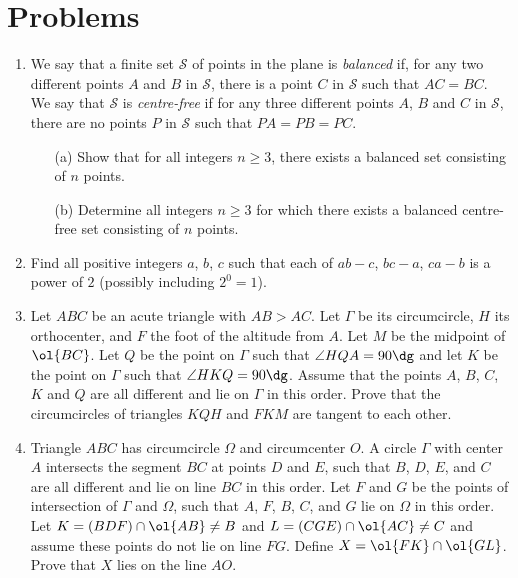 \documentclass[11pt]{scrartcl}
\begin{document}
\section{Problems}
\begin{enumerate}[\bfseries 1.]
\item %
We say that a finite set $\mathcal{S}$ of points in the plane
is \emph{balanced} if,
for any two different points $A$ and $B$ in $\mathcal{S}$,
there is a point $C$ in $\mathcal{S}$ such that $AC=BC$.
We say that $\mathcal{S}$ is \emph{centre-free} if for
any three different points $A$, $B$ and $C$ in $\mathcal{S}$,
there are no points $P$ in $\mathcal{S}$ such that $PA=PB=PC$.

\begin{enumerate}
\item[(a)] Show that for all integers $n\ge 3$,
  there exists a balanced set consisting of $n$ points.
\item[(b)] Determine all integers $n\ge 3$ for which
  there exists a balanced centre-free set consisting of $n$ points.
\end{enumerate}

\item %
Find all positive integers $a$, $b$, $c$ such that
each of $ab-c$, $bc-a$, $ca-b$ is a power of $2$
(possibly including $2^0=1$).

\item %
Let $ABC$ be an acute triangle with $AB > AC$.
Let $\Gamma$ be its circumcircle, $H$ its orthocenter, and $F$ the foot of the altitude from $A$.
Let $M$ be the midpoint of $\ol{BC}$.
Let $Q$ be the point on $\Gamma$ such that $\angle HQA = 90\dg$
and let $K$ be the point on $\Gamma$ such that $\angle HKQ = 90\dg$.
Assume that the points $A$, $B$, $C$, $K$ and $Q$ are all different and lie on $\Gamma$ in this order.
Prove that the circumcircles of triangles $KQH$ and $FKM$ are tangent to each other.

\item %
Triangle $ABC$ has circumcircle $\Omega$ and circumcenter $O$.
A circle $\Gamma$ with center $A$
intersects the segment $BC$ at points $D$ and $E$,
such that $B$, $D$, $E$, and $C$ are all different
and lie on line $BC$ in this order.
Let $F$ and $G$ be the points of intersection of $\Gamma$ and $\Omega$,
such that $A$, $F$, $B$, $C$, and $G$ lie on $\Omega$ in this order.
Let $K = (BDF) \cap \ol{AB} \neq B$
and $L = (CGE) \cap \ol{AC} \neq C$
and assume these points do not lie on line $FG$.
Define $X = \ol{FK} \cap \ol{GL}$.
Prove that $X$ lies on the line $AO$.


\end{enumerate}
\end{document}

